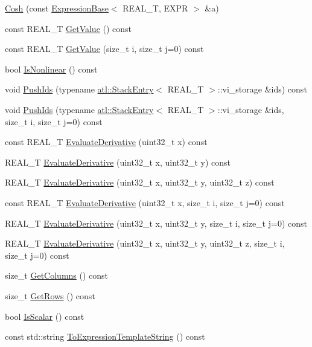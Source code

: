 \begin{DoxyCompactItemize}
\item 
\hyperlink{structatl_1_1_cosh_a01f70e880c5b34f0b1c3fe53cc81cf25}{Cosh} (const \hyperlink{structatl_1_1_expression_base}{Expression\+Base}$<$ R\+E\+A\+L\+\_\+\+T, E\+X\+P\+R $>$ \&a)
\item 
const R\+E\+A\+L\+\_\+\+T \hyperlink{structatl_1_1_cosh_a5d27569743cf020d80776454bd20b09a}{Get\+Value} () const 
\item 
const R\+E\+A\+L\+\_\+\+T \hyperlink{structatl_1_1_cosh_a0fed96ec2f9c805a0263e6ad8fee2024}{Get\+Value} (size\+\_\+t i, size\+\_\+t j=0) const 
\item 
bool \hyperlink{structatl_1_1_cosh_adf2314cfd3f1b82820fe27eb2fd0849a}{Is\+Nonlinear} () const 
\item 
void \hyperlink{structatl_1_1_cosh_a017597730da76a5672f98de2c44e2ea1}{Push\+Ids} (typename \hyperlink{structatl_1_1_stack_entry}{atl\+::\+Stack\+Entry}$<$ R\+E\+A\+L\+\_\+\+T $>$\+::vi\+\_\+storage \&ids) const 
\item 
void \hyperlink{structatl_1_1_cosh_aa4dde595aa26d6b04c3fa5992bc5698e}{Push\+Ids} (typename \hyperlink{structatl_1_1_stack_entry}{atl\+::\+Stack\+Entry}$<$ R\+E\+A\+L\+\_\+\+T $>$\+::vi\+\_\+storage \&ids, size\+\_\+t i, size\+\_\+t j=0) const 
\item 
const R\+E\+A\+L\+\_\+\+T \hyperlink{structatl_1_1_cosh_a16543cbae7297561b9f11bea8026829a}{Evaluate\+Derivative} (uint32\+\_\+t x) const 
\item 
R\+E\+A\+L\+\_\+\+T \hyperlink{structatl_1_1_cosh_affc49ebbe26c43e86f83078af0c08c96}{Evaluate\+Derivative} (uint32\+\_\+t x, uint32\+\_\+t y) const 
\item 
R\+E\+A\+L\+\_\+\+T \hyperlink{structatl_1_1_cosh_ab8393c0bbe1606f3a7e6b4a5d4429090}{Evaluate\+Derivative} (uint32\+\_\+t x, uint32\+\_\+t y, uint32\+\_\+t z) const 
\item 
const R\+E\+A\+L\+\_\+\+T \hyperlink{structatl_1_1_cosh_aadbdc94b4ff2f19c1b888e32143c5266}{Evaluate\+Derivative} (uint32\+\_\+t x, size\+\_\+t i, size\+\_\+t j=0) const 
\item 
R\+E\+A\+L\+\_\+\+T \hyperlink{structatl_1_1_cosh_a57fa6b5b7d9e79206af3bf5bce579920}{Evaluate\+Derivative} (uint32\+\_\+t x, uint32\+\_\+t y, size\+\_\+t i, size\+\_\+t j=0) const 
\item 
R\+E\+A\+L\+\_\+\+T \hyperlink{structatl_1_1_cosh_ad5168fb3efbe6ce65f4794ffd471a166}{Evaluate\+Derivative} (uint32\+\_\+t x, uint32\+\_\+t y, uint32\+\_\+t z, size\+\_\+t i, size\+\_\+t j=0) const 
\item 
size\+\_\+t \hyperlink{structatl_1_1_cosh_acce74e20fa213340265fdde3a7e5b0fe}{Get\+Columns} () const 
\item 
size\+\_\+t \hyperlink{structatl_1_1_cosh_a058c010882bbb34bba5da54bdbe3452b}{Get\+Rows} () const 
\item 
bool \hyperlink{structatl_1_1_cosh_a1e7bcad2334937ddb37d14773a6086d7}{Is\+Scalar} () const 
\item 
const std\+::string \hyperlink{structatl_1_1_cosh_a142b32ec1f1d0d2dab6e504b986b4446}{To\+Expression\+Template\+String} () const 
\end{DoxyCompactItemize}
